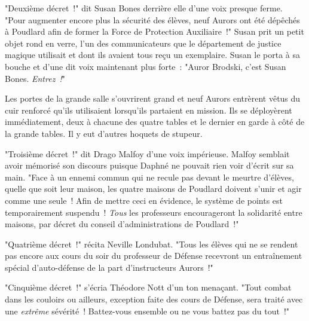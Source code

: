 "Deuxième décret~!" dit Susan Bones derrière elle d'une voix presque ferme. "Pour augmenter encore plus la sécurité des élèves, neuf Aurors ont été dépêchés à Poudlard afin de former la Force de Protection Auxiliaire~!" Susan prit un petit objet rond en verre, l'un des communicateurs que le département de justice magique utilisait et dont ils avaient tous reçu un exemplaire. Susan le porta à sa bouche et d'une dit voix maintenant plus forte~: "Auror Brodski, c'est Susan Bones. \emph{Entrez~!}"

Les portes de la grande salle s'ouvrirent grand et neuf Aurors entrèrent vêtus du cuir renforcé qu'ils utilisaient lorsqu'ils partaient en mission. Ils se déployèrent immédiatement, deux à chacune des quatre tables et le dernier en garde à côté de la grande tables. Il y eut d'autres hoquets de stupeur.

"Troisième décret~!" dit Drago Malfoy d'une voix impérieuse. Malfoy semblait avoir mémorisé son discours puisque Daphné ne pouvait rien voir d'écrit sur sa main. "Face à un ennemi commun qui ne recule pas devant le meurtre d'élèves, quelle que soit leur maison, les quatre maisons de Poudlard doivent s'unir et agir comme une seule~! Afin de mettre ceci en évidence, le système de points est temporairement suspendu~! \emph{Tous} les professeurs encourageront la solidarité entre maisons, par décret du conseil d'administrations de Poudlard~!"

"Quatrième décret~!" récita Neville Londubat. "Tous les élèves qui ne se rendent pas encore aux cours du soir du professeur de Défense recevront un entraînement spécial d'auto-défense de la part d'instructeurs Aurors~!"

"Cinquième décret~!" s'écria Théodore Nott d'un ton menaçant. "Tout combat dans les couloirs ou ailleurs, exception faite des cours de Défense, sera traité avec une \emph{extrême} sévérité~! Battez-vous ensemble ou ne vous battez pas du tout~!"

